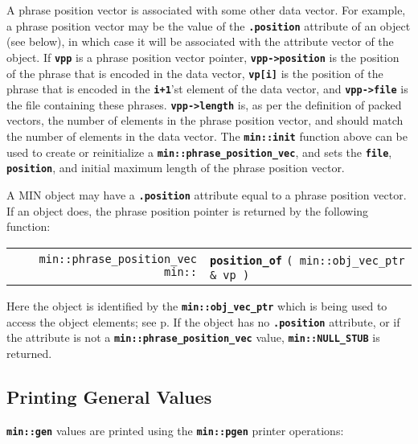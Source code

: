\documentclass[12pt]{article}
\makeatletter
\newcommand{\TT}[1]{{\tt \bfseries #1}}
\newcommand{\ttindex}[1]{\index{#1@{\tt #1}}}
\newcommand{\pagref}[1]{p\pageref{#1}}
\newcommand{\EOL}{\penalty \exhyphenpenalty}
\newenvironment{indpar}[1][0.3in]%
	{\begin{list}{}%
		     {\setlength{\itemsep}{0in}%
		      \setlength{\topsep}{0in}%
		      \setlength{\parsep}{1ex}%
		      \setlength{\labelwidth}{#1}%
		      \setlength{\leftmargin}{#1}%
		      \addtolength{\leftmargin}{\labelsep}}%
	 \item}%
	{\end{list}}
\newcommand{\LABEL}[1]{\label{#1}}
\newcommand{\MINKEY}[1]%
	   {\TT{#1}\ttindex{min::#1}\ttindex{#1}}
\makeatother
\begin{document}
A phrase position vector is associated with some other data vector.
For example, a phrase position vector may be the value of the
\TT{.position} attribute of an object
(see below), in which case it will be associated with
the attribute vector of the object.
If \TT{vpp} is a phrase position vector pointer, \TT{vpp->\EOL position}
is the position of the phrase that is encoded in the data vector,
\TT{vp[i]} is the position of the phrase that is encoded in
the \TT{i+1}'st element of the data vector, and
\TT{vpp->\EOL file} is the file containing these phrases.
\TT{vpp->\EOL length} is, as per the definition of packed vectors,
the number of elements in the phrase position vector, and should
match the number of elements in the data vector.
The \TT{min::\EOL init} function above can be used to create or
reinitialize a \TT{min::\EOL phrase\_\EOL position\_\EOL vec},
and sets the \TT{file}, \TT{position}, and initial maximum length
of the phrase position vector.

A MIN object may have a \TT{.position} attribute equal to a
phrase position vector.  If an object does, the phrase position
pointer is returned by the following function:

\begin{indpar}[1em]\begin{tabular}{r@{}l}
\verb|min::phrase_position_vec min::| & \MINKEY{position\_of}
    \verb|( min::obj_vec_ptr & vp )|
\LABEL{MIN::POSITION_OF_OBJECT_VEC_PTR} \\
\end{tabular}\end{indpar}

Here the object is identified by the \TT{min::\EOL obj\_\EOL vec\_\EOL ptr}
which is being used to access the object elements; see
\pagref{MIN::OBJ_VEC_PTR_OF_GEN}.
If the object has no \TT{.position} attribute, or if the attribute is
not a \TT{min::\EOL phrase\_\EOL position\_\EOL vec} value,
\TT{min::\EOL NULL\_\EOL STUB} is returned.

\subsection{Printing General Values}
\label{PRINTING-GENERAL-VALUES}

\TT{min::gen} values are printed using the \TT{min::\EOL pgen} printer
operations:
\end{document}

